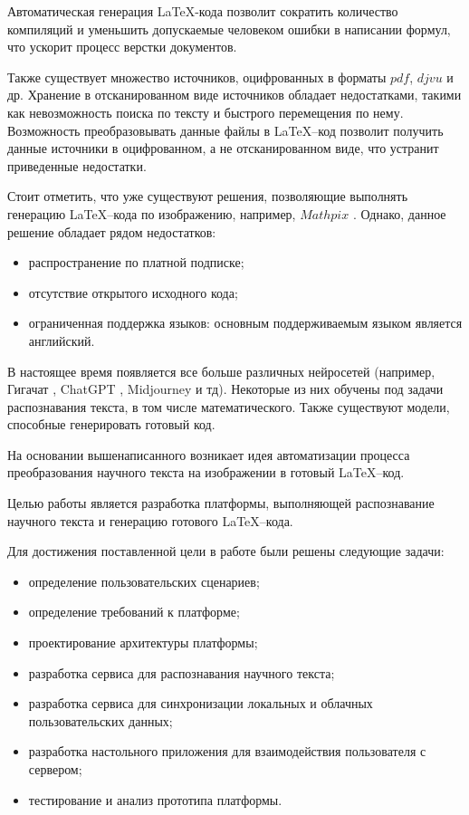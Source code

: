 Автоматическая генерация \LaTeX\--кода позволит сократить количество компиляций и уменьшить допускаемые человеком ошибки в написании формул, что ускорит процесс верстки документов.

Также существует множество источников, оцифрованных в форматы $pdf$, $djvu$ и др. 
Хранение в отсканированном виде источников обладает недостатками, такими как невозможность поиска по тексту и быстрого перемещения по нему.
Возможность преобразовывать данные файлы в \LaTeX--код позволит получить данные источники в оцифрованном, а не отсканированном виде, что устранит приведенные недостатки.

Стоит отметить, что уже существуют решения, позволяющие выполнять генерацию \LaTeX--кода по изображению, например, $Mathpix$ \cite{mathpix}. Однако, данное решение обладает рядом недостатков:
\begin{itemize}
    \item распространение по платной подписке;
    \item отсутствие открытого исходного кода;
    \item ограниченная поддержка языков: основным поддерживаемым языком является английский.
\end{itemize}

В настоящее время появляется все больше различных нейросетей (например, Гигачат \cite{gigachat}, ChatGPT \cite{chat_gpt}, Midjourney \cite{midjourney} и тд). Некоторые из них обучены под задачи распознавания текста, в том числе математического. 
Также существуют модели, способные генерировать готовый код. 

На основании вышенаписанного возникает идея автоматизации процесса преобразования научного текста на изображении в готовый \LaTeX--код.


Целью работы является разработка платформы, выполняющей распознавание научного текста и  генерацию готового \LaTeX--кода.

Для достижения поставленной цели в работе были решены следующие задачи:
\begin{itemize}
    \item определение пользовательских сценариев;
    \item определение требований к платформе;
    \item проектирование архитектуры платформы;
    \item разработка сервиса для распознавания научного текста;
    \item разработка сервиса для синхронизации локальных и облачных пользовательских данных;
    \item разработка настольного приложения для взаимодействия пользователя с сервером;
    \item тестирование и анализ прототипа платформы.
\end{itemize}

